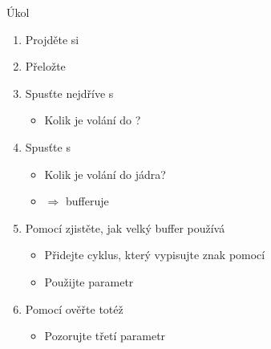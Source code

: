 \begin{frame}{Úkol}

  \begin{enumerate}
    \item Projděte si \ifpbbin
    \else\ifpcdirlinux
    \else
    \fi\fi
    \item Přeložte

    \item Spusťte nejdříve s 
    \begin{itemize}
      \item Kolik je volání  do ?
    \end{itemize}

    \item Spusťte s 
    \begin{itemize}
      \item Kolik je volání  do jádra?
      \item $\Rightarrow$  bufferuje
    \end{itemize}

    \item Pomocí  zjistěte, jak velký buffer  používá
    \begin{itemize}
      \item Přidejte cyklus, který vypisujte znak pomocí 
      \item Použijte parametr 
    \end{itemize}

    \item Pomocí  ověřte totéž
    \begin{itemize}
      \item Pozorujte třetí parametr 
    \end{itemize}
  \end{enumerate}

\end{frame}


